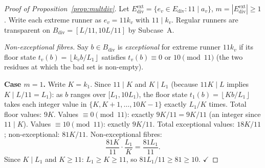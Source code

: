 \documentclass[11pt]{article}
\theoremstyle{definition}
\newcommand{\Ediv}{E_{\mathrm{div}}}
\newcommand{\floor}[1]{\left\lfloor #1 \right\rfloor}
\begin{document}
\begin{proof}[Proof of Proposition~\ref{prop:multdiv}]
  Let $\Ediv^{\mathrm{ext}} = \{e_v \in \Ediv : 11 \mid a_v\}$,
  $m = |\Ediv^{\mathrm{ext}}| \geq 1$.
  Write each extreme runner as $e_v = 11 k_v$ with $11 \mid k_v$.
  Regular runners are transparent on $B_{\mathrm{div}} = [L/11, 10L/11]$
  by Subcase~A.

  \textit{Non-exceptional fibres.}
  Say $b \in B_{\mathrm{div}}$ is \emph{exceptional} for extreme runner
  $11k_v$ if its floor state $t_v(b) = \floor{k_v b/L_1}$ satisfies
  $t_v(b) \equiv 0$ or $10 \pmod{11}$
  (the two residues at which the bad set is non-empty).

  \medskip
  \noindent\textbf{Case $m=1$.}
  Write $K = k_1$.  Since $11 \mid K$ and $K \mid L_1$ (because
  $11K \mid L$ implies $K \mid L/11 = L_1$): as $b$ ranges over
  $[L_1, 10L_1)$, the floor state $t_1(b) = \floor{Kb/L_1}$ takes
  each integer value in $\{K,K+1,\ldots,10K-1\}$ exactly $L_1/K$
  times.
  Total floor values: $9K$.
  Values $\equiv 0 \pmod{11}$: exactly $9K/11 = 9K/11$ (an integer
  since $11 \mid K$).
  Values $\equiv 10 \pmod{11}$: exactly $9K/11$.
  Total exceptional values: $18K/11$; non-exceptional: $81K/11$.
  Non-exceptional fibres:
  \[
    \frac{81K}{11} \cdot \frac{L_1}{K} = \frac{81 L_1}{11}.
  \]
  Since $K \mid L_1$ and $K \geq 11$: $L_1 \geq K \geq 11$, so
  $81L_1/11 \geq 81 \geq 10$. $\checkmark$


\end{proof}
\end{document}
